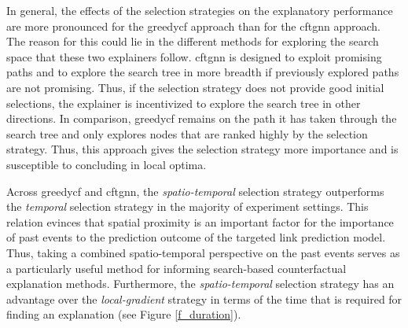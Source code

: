 In general, the effects of the selection strategies on the explanatory performance are more pronounced for the \gls{greedycf} approach than for the \gls{cftgnn} approach. The reason for this could lie in the different methods for exploring the search space that these two explainers follow. \gls{cftgnn} is designed to exploit promising paths and to explore the search tree in more breadth if previously explored paths are not promising. Thus, if the selection strategy does not provide good initial selections, the explainer is incentivized to explore the search tree in other directions. In comparison, \gls{greedycf} remains on the path it has taken through the search tree and only explores nodes that are ranked highly by the selection strategy. Thus, this approach gives the selection strategy more importance and is susceptible to concluding in local optima.

Across \gls{greedycf} and \gls{cftgnn}, the \textit{spatio-temporal} selection strategy outperforms the \textit{temporal} selection strategy in the majority of experiment settings. This relation evinces that spatial proximity is an important factor for the importance of past events to the prediction outcome of the targeted link prediction model. Thus, taking a combined spatio-temporal perspective on the past events serves as a particularly useful method for informing search-based counterfactual explanation methods. Furthermore, the \textit{spatio-temporal} selection strategy has an advantage over the \textit{local-gradient} strategy in terms of the time that is required for finding an explanation (see Figure \ref{f_duration}). 



